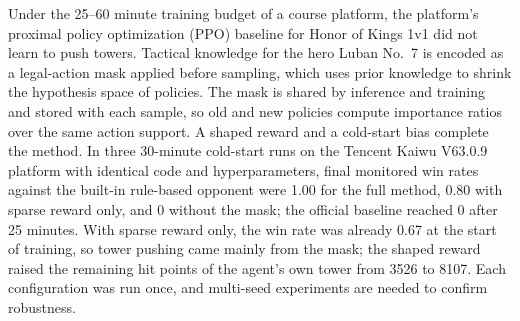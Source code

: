 \begin{abstract}
课程平台单次训练只有 \qtyrange{25}{60}{\minute}，在这一预算下，王者荣耀 1v1 的平台近端策略优化（PPO）基线未能推塔。为此，把鲁班七号的战术知识写成采样前的合法动作掩码，以先验知识缩小策略的假设空间；掩码在训练与推理中共用并随样本保存，使新旧策略在同一动作支持集上计算重要性比率。方法另含混合塑形奖励与冷启动偏置。在腾讯开悟 V63.0.9 平台上开展三组同代码、同超参数的 \qty{30}{\minute} 冷启动训练，对内置规则对手的终点监控胜率为：完整方法 \num{1.00}，仅用稀疏奖励 \num{0.80}，去掉掩码 \num{0}；官方基线训练 \qty{25}{\minute} 后为 \num{0}。仅用稀疏奖励时胜率在训练开始即为 \num{0.67}，推塔能力主要来自掩码；混合奖励使己方外塔余血由 \num{3526} 升至 \num{8107}。每组配置只运行一次，结论的稳健性仍需多随机种子实验检验。
\end{abstract}

\begin{enabstract}
Under the 25--60 minute training budget of a course platform, the platform's proximal policy optimization (PPO) baseline for Honor of Kings 1v1 did not learn to push towers. Tactical knowledge for the hero Luban No.~7 is encoded as a legal-action mask applied before sampling, which uses prior knowledge to shrink the hypothesis space of policies. The mask is shared by inference and training and stored with each sample, so old and new policies compute importance ratios over the same action support. A shaped reward and a cold-start bias complete the method. In three 30-minute cold-start runs on the Tencent Kaiwu V63.0.9 platform with identical code and hyperparameters, final monitored win rates against the built-in rule-based opponent were 1.00 for the full method, 0.80 with sparse reward only, and 0 without the mask; the official baseline reached 0 after 25 minutes. With sparse reward only, the win rate was already 0.67 at the start of training, so tower pushing came mainly from the mask; the shaped reward raised the remaining hit points of the agent's own tower from 3526 to 8107. Each configuration was run once, and multi-seed experiments are needed to confirm robustness.
\end{enabstract}
